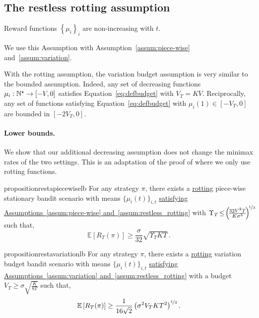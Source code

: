 \subsection{The restless rotting assumption}
\label{subsec:restless-rotting}
\begin{assumption}
\label{assum:restless_rotting}
Reward functions $\left\{\mu_i \right\}_i$ are non-increasing with $t$.
\end{assumption}
We use this Assumption with Assumption~\ref{assum:piece-wise} and~\ref{assum:variation}.
\begin{remark}
\label{remark:budget}
With the rotting assumption, the variation budget assumption is very similar to the bounded assumption. Indeed, any set of decreasing functions $\mu_i : {\mathbb N}^\star \rightarrow [- V, 0]$ satisfies Equation~\ref{eq:defbudget} with $V_T = KV$. Reciprocally, any set of functions satisfying Equation~\ref{eq:defbudget} with $\mu_i(1) \in [- V_T, 0]$ are bounded in $[- 2V_T, 0]$. 
\end{remark}

\paragraph{Lower bounds.} We show that our additional decreasing assumption does not change the minimax rates of the two settings. This is an adaptation of the proof of \citet{besbes2014stochastic} where we only use rotting functions.

\begin{restatable}{proposition}{restapiecewiselb}
\label{prop:piecewise_lb2}
For any strategy $\pi$, there exists a \underline{rotting} piece-wise stationary bandit scenario with means $\{\mu_i(t)\}_{i,t}$ \underline{satisfying Assumptions~\ref{assum:piece-wise} and~\ref{assum:restless_rotting}} with $\Upsilon_T\! \leq \!\left(\!\frac{32V^2T }{K\sigma^2}\!\right)^{\!\nicefrac{1}{3}\!}\!$ such that,
\[
    \mathbb{E}\left[R_T(\pi)\right] \geq \frac{\sigma}{32}\sqrt{ \Upsilon_T KT}\,.
\]
\end{restatable}
\begin{restatable}{proposition}{restavariationlb}
\label{prop:variation_lb2}
For any strategy $\pi$, there exists a \underline{rotting} variation budget bandit scenario with means $\{\mu_i(t)\}_{i,t}$ \underline{satisfying Assumptions~\ref{assum:variation} and~\ref{assum:restless_rotting}} with a budget $V_T \geq \sigma \sqrt{\frac{K}{8T}}$ such that,
%
\[
    \mathbb{E}\left[R_T(\pi)\right] \geq \frac{1}{16\sqrt{2}} \left(\sigma^2 V_T KT^2\right)^{\nicefrac{1}{3}}.
\]
\end{restatable}

